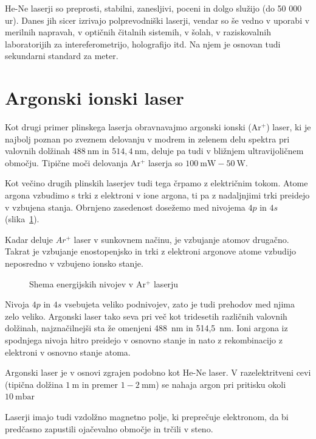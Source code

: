 He-Ne laserji so preprosti, stabilni, zanesljivi, poceni in dolgo služijo (do 50 000 ur).
Danes jih sicer izrivajo polprevodniški laserji, vendar so še vedno v uporabi
v merilnih napravah, v optičnih čitalnih sistemih, v šolah, v raziskovalnih 
laboratorijih za intereferometrijo, holografijo itd. Na njem je osnovan tudi 
sekundarni standard za meter.

\section{Argonski ionski laser}

Kot drugi primer plinskega laserja obravnavajmo argonski ionski (Ar$^+$) laser,
ki je najbolj poznan po zveznem delovanju v modrem in zelenem delu spektra pri 
valovnih dolžinah $488~\si{\nano\metre}$ in $514,4~\si{\nano\metre}$, deluje 
pa tudi v bližnjem ultravijoličnem območju. Tipične moči delovanja Ar$^+$ laserja
so $100~\si{\milli\watt} - 50~\si{\watt}$.

Kot večino drugih plinskih laserjev tudi tega črpamo z električnim tokom.
Atome argona vzbudimo s trki z elektroni v ione argona, ti pa z nadaljnjimi
trki preidejo v vzbujena stanja. Obrnjeno zasedenost
dosežemo med nivojema $4p$ in $4s$ (slika~\ref{fig:ArE}).

\begin{remark}
 Kadar deluje $Ar^+$ laser v sunkovnem načinu, je vzbujanje atomov drugačno.
 Takrat je vzbujanje enostopenjsko in trki z elektroni argonove atome
 vzbudijo neposredno v vzbujeno ionsko stanje.
\end{remark}

\begin{figure}[h]
\centering
\def\svgwidth{80truemm} 

\caption{Shema energijskih nivojev v Ar$^+$ laserju}
\label{fig:ArE}
\end{figure}

Nivoja $4p$ in $4s$ vsebujeta veliko podnivojev, zato je tudi prehodov med
njima zelo veliko. Argonski laser tako seva pri več kot tridesetih različnih
valovnih dolžinah, najznačilnejši sta že omenjeni 488~nm in 514,5~nm. Ioni argona
iz spodnjega nivoja hitro preidejo v osnovno stanje in nato z rekombinacijo z elektroni
v osnovno stanje atoma.

Argonski laser je v osnovi zgrajen podobno kot He-Ne laser. V razelektritveni cevi
(tipična dolžina $1~\si{\metre}$ in premer $1-2~\si{\milli\metre}$)
se nahaja argon pri pritisku okoli $10~\si{\milli\bar}$

Laserji imajo tudi vzdolžno magnetno polje, ki preprečuje elektronom, da bi predčasno
zapustili ojačevalno območje in trčili v steno. 

